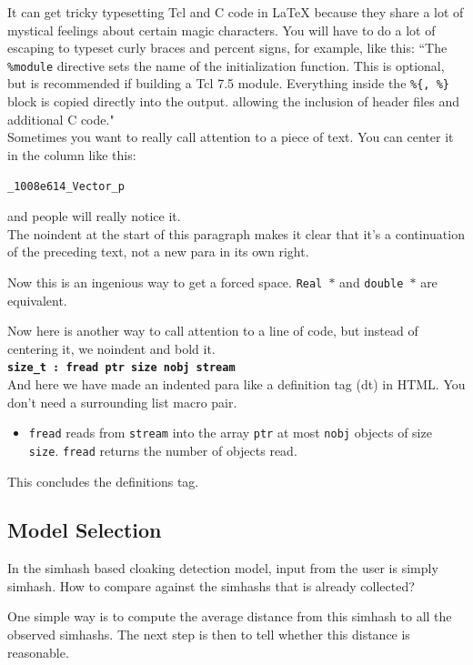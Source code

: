 It can get tricky typesetting Tcl and C code in LaTeX because they share
a lot of mystical feelings about certain magic characters.  You
will have to do a lot of escaping to typeset curly braces and percent
signs, for example, like this:
``The {\tt \%module} directive
sets the name of the initialization function.  This is optional, but is
recommended if building a Tcl 7.5 module.
Everything inside the {\tt \%\{, \%\}}
block is copied directly into the output. allowing the inclusion of
header files and additional C code." \\

Sometimes you want to really call attention to a piece of text.  You
can center it in the column like this:
\begin{center}
  {\tt \_1008e614\_Vector\_p}
\end{center}
and people will really notice it.\\

\noindent
The noindent at the start of this paragraph makes it clear that it's
a continuation of the preceding text, not a new para in its own right.


Now this is an ingenious way to get a forced space.
{\tt Real~$*$} and {\tt double~$*$} are equivalent. 

Now here is another way to call attention to a line of code, but instead
of centering it, we noindent and bold it.\\

\noindent
{\bf \tt size\_t : fread ptr size nobj stream } \\

And here we have made an indented para like a definition tag (dt)
in HTML.  You don't need a surrounding list macro pair.
\begin{itemize}
  \item[]  {\tt fread} reads from {\tt stream} into the array {\tt ptr} at
    most {\tt nobj} objects of size {\tt size}.   {\tt fread} returns
    the number of objects read. 
\end{itemize}
This concludes the definitions tag.

\subsection{Model Selection}
In the simhash based cloaking detection model, input from the user is simply simhash. How to compare against the simhashs that is already collected?

One simple way is to compute the average distance from this simhash to all the observed simhashs. The next step is then to tell whether this distance is reasonable. 


